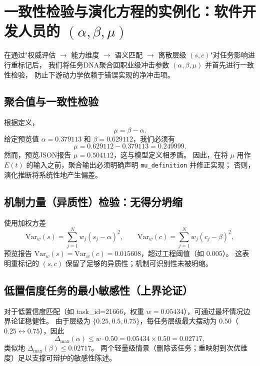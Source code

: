 \section{一致性检验与演化方程的实例化：软件开发人员的 $(\alpha,\beta,\mu)$}

在通过"权威评估 $\rightarrow$ 能力维度 $\rightarrow$ 语义匹配 $\rightarrow$ 离散层级 $(s,c)$"对任务影响进行重标记后，
我们将任务DNA聚合回职业级冲击参数 $(\alpha,\beta,\mu)$ 并首先进行一致性检验，
防止下游动力学依赖于错误实现的净冲击项。

\subsection{聚合值与一致性检验}

根据定义，
\begin{equation}
    \mu=\beta-\alpha.
\end{equation}
给定预览值 $\alpha=0.379113$ 和 $\beta=0.629112$，我们必须有
\begin{equation}
    \mu = 0.629112-0.379113 = 0.249999.
\end{equation}
然而，预览JSON报告 $\mu=0.504112$，这与模型定义相矛盾。
因此，在将 $\mu$ 用作 $E(t)$ 的输入之前，聚合输出必须明确声明 \texttt{mu\_definition} 并修正实现；
否则，演化推断将系统性地产生偏差。

\subsection{机制力量（异质性）检验：无得分坍缩}

使用加权方差
\begin{equation}
    \mathrm{Var}_w(s)=\sum_{j=1}^{N} w_j (s_j-\alpha)^2,\qquad
    \mathrm{Var}_w(c)=\sum_{j=1}^{N} w_j (c_j-\beta)^2,
\end{equation}
预览报告 $\mathrm{Var}_w(s)=\mathrm{Var}_w(c)=0.015608$，超过工程阈值（如 $0.005$）。
这表明重标记的 $(s,c)$ 保留了足够的异质性；机制可识别性未被坍缩。

\subsection{低置信度任务的最小敏感性（上界论证）}

对于低置信度匹配（如 task\_id=21666，权重 $w=0.05434$），可通过最坏情况边界论证稳健性。
由于层级为 $\{0.25,0.5,0.75\}$，每任务层级最大摆动为 $0.50$（$0.25\leftrightarrow0.75$），因此
\begin{equation}
    \Delta_{\max}(\alpha)\le w\cdot 0.50 = 0.05434\times 0.50 = 0.02717,
\end{equation}
类似地 $\Delta_{\max}(\beta)\le 0.02717$。
两个轻量级情景（删除该任务；重映射到次优维度）足以支撑可辩护的敏感性陈述。

